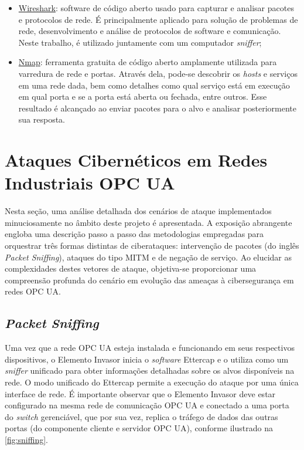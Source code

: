 \begin{itemize}
        \item \underline{Wireshark}: software de código aberto usado para capturar e analisar pacotes e protocolos de rede. É principalmente aplicado para solução de problemas de rede, desenvolvimento e análise de protocolos de software e comunicação. Neste trabalho, é utilizado juntamente com um computador \textit{sniffer};
        \item \underline{Nmap}: ferramenta gratuita de código aberto amplamente utilizada para varredura de rede e portas. Através dela, pode-se descobrir os \textit{hosts} e serviços em uma rede dada, bem como detalhes como qual serviço está em execução em qual porta e se a porta está aberta ou fechada, entre outros. Esse resultado é alcançado ao enviar pacotes para o alvo e analisar posteriormente sua resposta.
    \end{itemize}

\section{Ataques Cibernéticos em Redes Industriais OPC UA} \label{sec:attacks}

    Nesta seção, uma análise detalhada dos cenários de ataque implementados minuciosamente no âmbito deste projeto é apresentada. A exposição abrangente engloba uma descrição passo a passo das metodologias empregadas para orquestrar três formas distintas de ciberataques: intervenção de pacotes (do inglês \textit{Packet Sniffing}), ataques do tipo MITM e de negação de serviço. Ao elucidar as complexidades destes vetores de ataque, objetiva-se proporcionar uma compreensão profunda do cenário em evolução das ameaças à cibersegurança em redes OPC UA.

    \subsection{\textit{Packet Sniffing}}

    Uma vez que a rede OPC UA esteja instalada e funcionando em seus respectivos dispositivos, o Elemento Invasor inicia o \textit{software} Ettercap e o utiliza como um \textit{sniffer} unificado para obter informações detalhadas sobre os alvos disponíveis na rede. O modo unificado do Ettercap permite a execução do ataque por uma única interface de rede. É importante observar que o Elemento Invasor deve estar configurado na mesma rede de comunicação OPC UA e conectado a uma porta do \textit{switch} gerenciável, que por sua vez, replica o tráfego de dados das outras portas (do componente cliente e servidor OPC UA), conforme ilustrado na \autoref{fig:sniffing}. 

